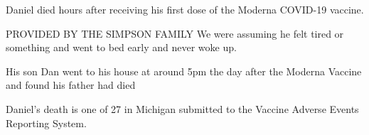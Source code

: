 Daniel died hours after receiving his first dose of the Moderna COVID-19
vaccine.

PROVIDED BY THE SIMPSON FAMILY We were assuming he felt tired or something and
went to bed early and never woke up.

His son Dan went to his house at around 5pm the day after the Moderna Vaccine
and found his father had died

Daniel’s death is one of 27 in Michigan submitted to the Vaccine Adverse Events
Reporting System.

